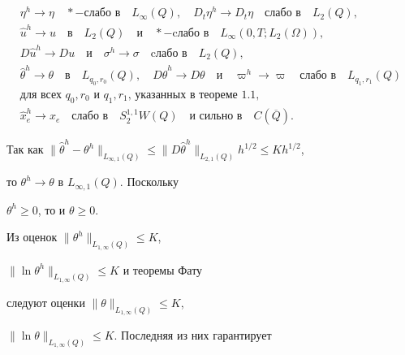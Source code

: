 \documentclass[12pt]{article}
\theoremstyle{plain} %
\theoremstyle{definition}
\numberwithin{equation}{section}
\begin{document}
\begin{gather*}


\eta^h\to\eta\quad \ast-\text{слабо в}\quad L_\infty(Q),\quad


D_t\eta^h\to D_t\eta\quad\text{слабо в}\quad L_2(Q),\\


%


\widehat u^h\to u\quad\text{в}\quad L_2(Q)\quad\text{и}\quad


\ast-\text{cлабо в}\quad L_\infty(0,T; L_2(\Omega)),\\


%


D\widehat u^h\to Du\quad\text{и}\quad \sigma^h\to\sigma\quad\text{cлабо в}


\quad L_2(Q),\\


%


\widehat\theta^h\to \theta\quad\text{в}\quad L_{q_0,r_0}(Q),\quad


D\widehat\theta^h\to D\theta\quad\text{и}\quad \varpi^h\to \varpi\quad


\text{слабо в}\quad L_{q_1,r_1}(Q)\\


%


\text{для всех $q_0, r_0$ и $q_1,r_1$, указанных в теореме 1.1,}\\


%


\widehat x_e^h\to x_e\quad\text{слабо в}\quad S_2^{1,1}W(Q)\quad


\text{и сильно в}\quad C(\overline Q).


\end{gather*}





Так как $\|\widehat\theta^h -\theta^h\|_{L_{\infty,1}(Q)}\le


\|D\widehat\theta^h\|_{L_{2,1}(Q)}h^{1/2}\le Kh^{1/2}$,


то $\theta^h\to\theta$ в $L_{\infty,1}(Q)$. Поскольку


$\theta^h\ge 0$, то и $\theta\ge 0$.


Из оценок $\|\theta^h\|_{L_{1,\infty}(Q)}\le K$,


$\|\ln\theta^h\|_{L_{1,\infty}(Q)}\le K$ и теоремы Фату


следуют оценки $\|\theta\|_{L_{1,\infty}(Q)}\le K$,


$\|\ln\theta\|_{L_{1,\infty}(Q)}\le K$. Последняя из них гарантирует
\end{document}
